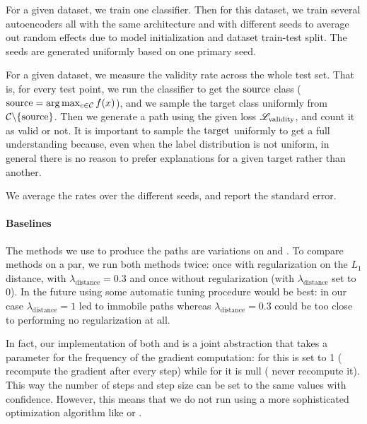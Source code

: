 \documentclass[../main.tex]{subfiles}
\begin{document}
For a given dataset, we train one classifier.
Then for this dataset, we train several autoencoders all with the same architecture and with different seeds to average out random effects due to model initialization and dataset train-test split.
The seeds are generated uniformly based on one primary seed.

For a given dataset, we measure the validity rate across the whole test set.
That is, for every test point, we run the classifier to get the $\mathrm{source}$ class ($\mathrm{source} = \arg\max_{c \in \mathcal{C}} f(x)$), and we sample the target class uniformly from $\mathcal{C} \backslash \{\mathrm{source}\}$.
Then we generate a path using the given loss $\mathscr{L}_\text{validity}$, and count it as valid or not.
It is important to sample the $\mathrm{target}$ uniformly to get a full understanding because, even when the label distribution is not uniform, in general there is no reason to prefer explanations for a given target rather than another.

We average the rates over the different seeds, and report the standard error.

\paragraph{Baselines}

The methods we use to produce the paths are variations on \ls{} and \revise{}.
To compare methods on a par, we run both methods twice: once with regularization on the $L_1$ distance, with $\lambda_\text{distance} = 0.3$ and once without regularization (with $\lambda_\text{distance}$ set to 0).
In the future using some automatic tuning procedure would be best: in our case $\lambda_\text{distance} = 1$ led to immobile paths whereas $\lambda_\text{distance} = 0.3$ could be too close to performing no regularization at all.

In fact, our implementation of both \ls{} and \revise{} is a joint abstraction that takes a parameter for the frequency of the gradient computation: for \revise{} this is set to 1 (\ie{} recompute the gradient after every step) while for \revise{} it is null (\ie{} never recompute it).
This way the number of steps and step size can be set to the same values with confidence.
However, this means that we do not run \revise{} using a more sophisticated optimization algorithm like  or .
\end{document}
